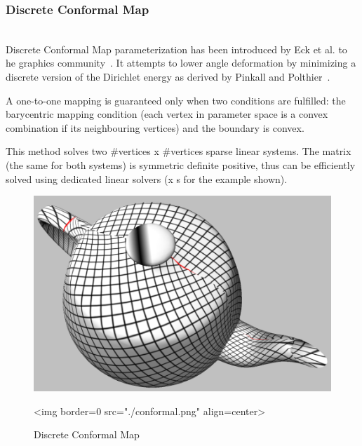 \subsubsection{Discrete Conformal Map}

  \\

Discrete Conformal Map parameterization has been introduced by Eck et
al. to he graphics community~\cite{cgal:fh-survey-05}. It attempts to
lower angle deformation by minimizing a discrete version of the
Dirichlet energy as derived by Pinkall and
Polthier~\cite{cgal:fh-survey-05}.


A one-to-one mapping is guaranteed only when two conditions are
fulfilled: the barycentric mapping condition (each vertex in parameter
space is a convex combination if its neighbouring vertices) and the
boundary is convex.


This method solves two \#vertices x \#vertices sparse linear
systems. The matrix (the same for both systems) is symmetric definite
positive, thus can be efficiently solved using dedicated linear
solvers (x s for the example shown).

\begin{figure}[bht]
    \begin{center}
        \begin{ccTexOnly}
            \includegraphics{Parameterization/conformal} %
        \end{ccTexOnly}
        \begin{ccHtmlOnly}
            <img border=0 src="./conformal.png" align=center>
        \end{ccHtmlOnly}
        \label{parameterization-fig-conformal}

        \caption{Discrete Conformal Map}
    \end{center}
\end{figure}


